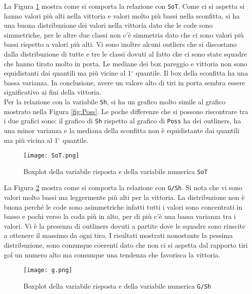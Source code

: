 La Figura \ref{fig:sot} mostra come si comporta la relazione con \texttt{SoT}. Come ci si aspetta si hanno valori più alti nella vittoria e valori molto più bassi nella sconfitta, si ha una buona distribuzione dei valori nella vittoria dato che le code sono simmetriche, per le altre due classi non c'è simmetria dato che ci sono valori più bassi rispetto a valori più alti. Vi sono inoltre alcuni outliers che si discostano dalla distribuzione di tutte e tre le classi dovuti al fatto che ci sono state squadre che hanno tirato molto in porta. Le mediane dei box pareggio e vittoria non sono equidistanti dai quantili ma più vicine al 1$^{\circ}$ quantile. Il box della sconfitta ha una bassa varianza. In conclusione, avere un valore alto di tiri in porta sembra essere significativo ai fini della vittoria.\\

Per la relazione con la variabile \texttt{Sh}, si ha un grafico molto simile al grafico mostrato nella Figura \ref{fig:Poss}. Le poche differenze che si possono riscontrare tra i due grafici sono: il grafico di \texttt{Sh} rispetto al grafico di \texttt{Poss} ha dei outliners, ha una minor varianza e la mediana della sconfitta non è equidistante dai quantili ma più vicina al 1$^{\circ}$ quantile.\\

\begin{figure}[htbp]
	\begin{center}
		\texttt{[image: SoT.png]}
		\caption{Boxplot della variabile risposta e della variabile numerica \texttt{SoT} } \label{fig:sot}
	\end{center}
\end{figure}

La Figura \ref{fig:g} mostra come si comporta la relazione con \texttt{G/Sh}. Si nota che vi sono valori molto bassi ma leggermente più alti per la vittoria. La distribuzione non è buona perché le code sono asimmetriche infatti tutti i valori sono concentrati in basso e pochi verso la coda più in alto, per di più c'è una bassa varianza tra i valori. Vi è la presenza di outliners dovuti a partite dove le squadre sono riuscite a ottenere il massimo da ogni tiro. I risultati mostrati nonostante la pessima distribuzione, sono comunque coerenti dato che non ci si aspetta dal rapporto tiri gol un numero alto ma comunque una tendenza che favorisca la vittoria.\\

\begin{figure}[htbp]
	\begin{center}
		\texttt{[image: g.png]}
		\caption{Boxplot della variabile risposta e della variabile numerica \texttt{G/Sh} } \label{fig:g}
	\end{center}
\end{figure}

